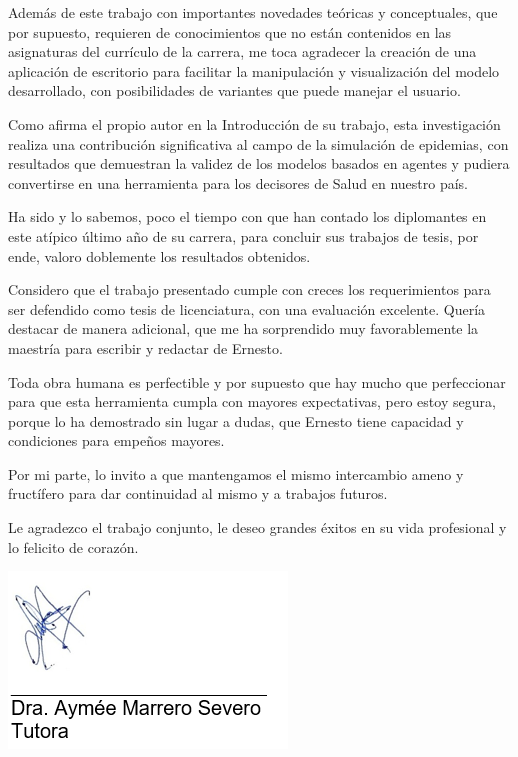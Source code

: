 \begin{opinion}
Además de este trabajo con importantes novedades teóricas y conceptuales, que por supuesto, requieren de conocimientos que no están contenidos en las asignaturas del currículo de la carrera, me toca agradecer la creación de una aplicación de escritorio para facilitar la manipulación y visualización del modelo desarrollado, con posibilidades de variantes que puede manejar el usuario. 

Como afirma el propio autor en la Introducción de su trabajo, esta investigación realiza una contribución significativa al campo de la simulación de epidemias, con resultados que demuestran la validez de los modelos basados en agentes y pudiera convertirse en una herramienta para los decisores de Salud en nuestro país.

Ha sido y lo sabemos, poco el tiempo con que han contado los diplomantes en este atípico último año de su carrera, para concluir sus trabajos de tesis, por ende, valoro doblemente los resultados obtenidos.

Considero que el trabajo presentado cumple con creces los requerimientos para ser defendido como tesis de licenciatura, con una evaluación excelente. Quería destacar de manera adicional, que me ha sorprendido muy favorablemente la maestría para escribir y redactar de Ernesto. 

Toda obra humana es perfectible y por supuesto que hay mucho que perfeccionar para que esta herramienta cumpla con mayores expectativas, pero estoy segura, porque lo ha demostrado sin lugar a dudas, que Ernesto tiene capacidad y condiciones para empeños mayores.

Por mi parte, lo invito a que mantengamos el mismo intercambio ameno y fructífero para dar continuidad al mismo y a trabajos futuros.

Le agradezco el trabajo conjunto, le deseo grandes éxitos en su vida profesional y lo felicito de corazón.


\includegraphics[width=0.5\linewidth]{Graphics/Opinion_Firma.png}

\end{opinion}